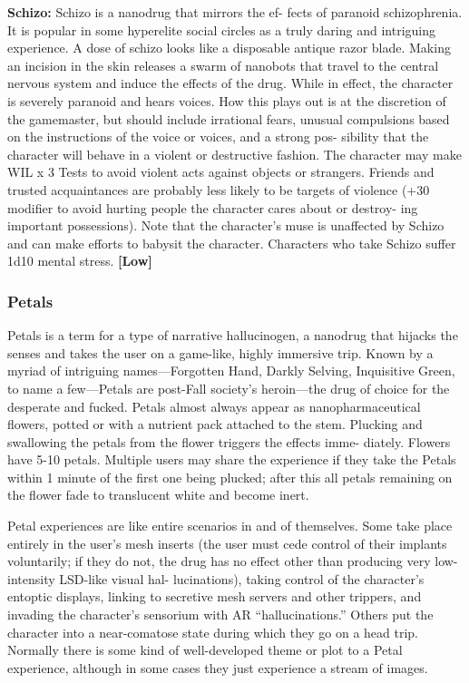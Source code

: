 \textbf{Schizo:} Schizo is a nanodrug that mirrors the ef-
fects of paranoid schizophrenia. It is popular in 
some hyperelite social circles as a truly daring and 
intriguing experience. A dose of schizo looks like a 
disposable antique razor blade. Making an incision 
in the skin releases a swarm of nanobots that travel 
to the central nervous system and induce the effects 
of the drug. While in effect, the character is severely 
paranoid and hears voices. How this plays out is at 
the discretion of the gamemaster, but should include 
irrational fears, unusual compulsions based on the 
instructions of the voice or voices, and a strong pos-
sibility that the character will behave in a violent or 
destructive fashion. The character may make WIL x 3 
Tests to avoid violent acts against objects or strangers. 
Friends and trusted acquaintances are probably less 
likely to be targets of violence (+30 modifier to avoid 
hurting people the character cares about or destroy-
ing important possessions). Note that the character's 
muse is unaffected by Schizo and can make efforts 
to babysit the character. Characters who take Schizo 
suffer 1d10 mental stress. \textbf{[Low]}

\subsubsection{Petals}

Petals is a term for a type of narrative hallucinogen, 
a nanodrug that hijacks the senses and takes the user 
on a game-like, highly immersive trip. Known by a 
myriad of intriguing names—Forgotten Hand, Darkly 
Selving, Inquisitive Green, to name a few—Petals are 
post-Fall society's heroin—the drug of choice for the 
desperate and fucked. Petals almost always appear as 
nanopharmaceutical flowers, potted or with a nutrient 
pack attached to the stem. Plucking and swallowing 
the petals from the flower triggers the effects imme-
diately. Flowers have 5-10 petals. Multiple users may 
share the experience if they take the Petals within 1 
minute of the first one being plucked; after this all 
petals remaining on the flower fade to translucent 
white and become inert.

Petal experiences are like entire scenarios in and of 
themselves. Some take place entirely in the user's mesh 
inserts (the user must cede control of their implants 
voluntarily; if they do not, the drug has no effect other 
than producing very low-intensity LSD-like visual hal-
lucinations), taking control of the character's entoptic 
displays, linking to secretive mesh servers and other 
trippers, and invading the character's sensorium with 
AR ``hallucinations.'' Others put the character into a 
near-comatose state during which they go on a head 
trip. Normally there is some kind of well-developed 
theme or plot to a Petal experience, although in some 
cases they just experience a stream of images.

